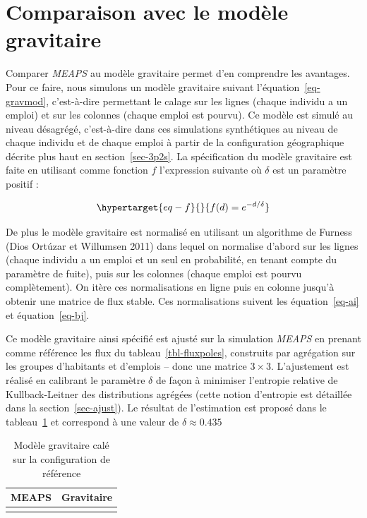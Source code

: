 \documentclass[
  10pt,
  a4paper,
  numbers=noendperiod,
  DIV=9]{scrreprt}
\begin{document}
\hypertarget{sec-compgravsynth}{%
\section{Comparaison avec le modèle
gravitaire}\label{sec-compgravsynth}}

Comparer \emph{MEAPS} au modèle gravitaire permet d'en comprendre les
avantages. Pour ce faire, nous simulons un modèle gravitaire suivant
l'équation~\ref{eq-gravmod}, c'est-à-dire permettant le calage sur les
lignes (chaque individu a un emploi) et sur les colonnes (chaque emploi
est pourvu). Ce modèle est simulé au niveau désagrégé, c'est-à-dire dans
ces simulations synthétiques au niveau de chaque individu et de chaque
emploi à partir de la configuration géographique décrite plus haut en
section~\ref{sec-3p2s}. La spécification du modèle gravitaire est faite
en utilisant comme fonction \(f\) l'expression suivante où \(\delta\)
est un paramètre positif :

\begin{equation}\protect\hypertarget{eq-f}{}{
f(d) = e^{-d/\delta}
}\label{eq-f}\end{equation}

De plus le modèle gravitaire est normalisé en utilisant un algorithme de
Furness (Dios Ortúzar et Willumsen 2011) dans lequel on normalise
d'abord sur les lignes (chaque individu a un emploi et un seul en
probabilité, en tenant compte du paramètre de fuite), puis sur les
colonnes (chaque emploi est pourvu complètement). On itère ces
normalisations en ligne puis en colonne jusqu'à obtenir une matrice de
flux stable. Ces normalisations suivent les équation~\ref{eq-ai} et
équation~\ref{eq-bj}.

Ce modèle gravitaire ainsi spécifié est ajusté sur la simulation
\emph{MEAPS} en prenant comme référence les flux du
tableau~\ref{tbl-fluxpoles}, construits par agrégation sur les groupes
d'habitants et d'emplois -- donc une matrice \(3 \times 3\).
L'ajustement est réalisé en calibrant le paramètre \(\delta\) de façon à
minimiser l'entropie relative de Kullback-Leitner des distributions
agrégées (cette notion d'entropie est détaillée dans la
section~\ref{sec-ajust}). Le résultat de l'estimation est proposé dans
le tableau~\ref{tbl-fluxgrav} et correspond à une valeur de
\(\delta \approx 0.435\)

\hypertarget{tbl-fluxgrav}{}
\begin{longtable}{cc}
\caption{\label{tbl-fluxgrav}Modèle gravitaire calé sur la configuration de référence }\tabularnewline

\toprule
MEAPS & Gravitaire \\ 
\midrule
 &  \\ 
\bottomrule
\end{longtable}
\end{document}
